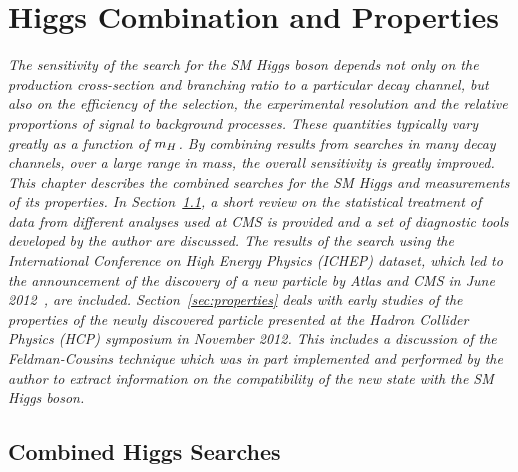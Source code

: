 \chapter{Higgs Combination and Properties}
\label{chap:combinations}

\emph{The sensitivity 
of the search for the SM Higgs boson depends not only on the production cross-section and 
branching ratio to a particular decay channel, but also on the efficiency
of the selection, the experimental resolution and the relative proportions of 
signal to background processes. These quantities typically vary greatly as a function of 
$m_{H}$. By combining results from searches
in many decay channels, over a large range in mass, 
the overall sensitivity is greatly improved.
This chapter describes the combined searches for the SM Higgs and measurements of its properties. 
In Section~\ref{sec:combinationmethodology}, a short review on the statistical 
treatment of data from different analyses used at CMS is provided and a set of diagnostic
tools developed by the author are discussed.
The results of the search using the International Conference on
High Energy Physics (ICHEP) dataset, 
which led to the announcement of the discovery of a new particle 
by Atlas and CMS in June 2012~\citep{HIG-12-028}, are included.
Section~\ref{sec:properties} deals with early studies of the 
properties of the newly discovered particle presented at the Hadron Collider Physics (HCP) 
symposium in November 2012. This includes a discussion of 
the Feldman-Cousins technique which was in part implemented and performed
by the author to extract information on the compatibility of the new 
state with the SM Higgs boson.}

\section{Combined Higgs Searches}
\label{sec:combinationmethodology}

